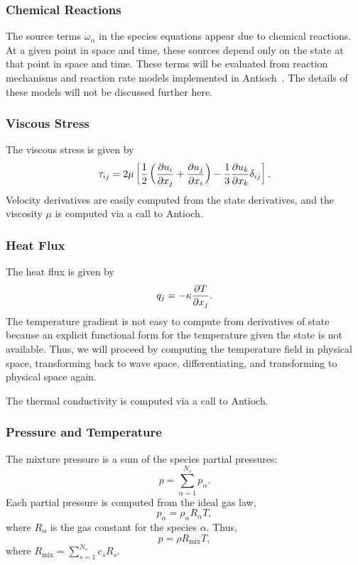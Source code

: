 \subsubsection{Chemical Reactions}
The source terms $\dot{\omega}_{\alpha}$ in the species equations
appear due to chemical reactions.  At a given point in space and time,
these sources depend only on the state at that point in space and
time.  These terms will be evaluated from reaction mechanisms and
reaction rate models implemented in Antioch~\cite{?}.  The details of
these models will not be discussed further here.

\subsubsection{Viscous Stress}
The viscous stress is given by
%
\begin{equation*}
\tau_{ij} =  2 \mu \left[ \frac{1}{2} \left(\frac{\partial u_i}{\partial x_j} + \frac{\partial u_j}{\partial x_i} \right) - \frac{1}{3} \frac{\partial u_k}{\partial x_k} \delta_{ij} \right].
\end{equation*}
% 
Velocity derivatives are easily computed from the state derivatives,
and the viscosity $\mu$ is computed via a call to Antioch.

\subsubsection{Heat Flux}
The heat flux is given by
%
\begin{equation*}
q_j = - \kappa \frac{\partial T}{\partial x_j}.
\end{equation*}
% 
The temperature gradient is not easy to compute from derivatives of
state because an explicit functional form for the temperature given
the state is not available.  Thus, we will proceed by computing the
temperature field in physical space, transforming back to wave space,
differentiating, and transforming to physical space again.

The thermal conductivity is computed via a call to Antioch.

\subsubsection{Pressure and Temperature}
The mixture pressure is a sum of the species partial pressures:
%
\begin{equation*}
p = \sum_{\alpha = 1}^{N_s} p_{\alpha}.
\end{equation*}
%
Each partial pressure is computed from the ideal gas law,
%
\begin{equation*}
p_{\alpha} = \rho_{\alpha} R_{\alpha} T,
\end{equation*}
% 
where $R_{\alpha}$ is the gas constant for the species $\alpha$.  Thus,
%
\begin{equation*}
p = \rho R_{\mathrm{mix}} T,
\end{equation*}
% 
where $R_{\mathrm{mix}} = \sum_{s=1}^{N_s} c_s R_s$.  

